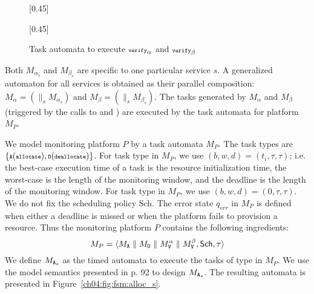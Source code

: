 \begin{figure}[h]
\captionsetup[subfigure]{font=scriptsize}
\centering
{}[0.45\textwidth]{
}%
[0.45\textwidth]{
%
}
\caption{{\scriptsize Task automata to execute ${\scriptsize\texttt{verify}}_\alpha$ and ${\scriptsize\texttt{verify}}_\beta$}}
\end{figure}

Both $M_{\alpha_s}$ and $M_{\beta_s}$ are specific to one particular service $s$.
A generalized automaton for all services is obtained as their parallel composition:$M_\alpha = (\parallel_s M_{\alpha_s})$ and $M_\beta = (\parallel_s M_{\beta_s})$.
The tasks generated by $M_\alpha$ and $M_\beta$ (triggered by the calls to
 and ) are executed by the task automata for platform $M_P$.

We model monitoring platform $P$ by a task automata $M_P$.
The task types are $\{{\scriptsize\texttt{A}}({\scriptsize\texttt{allocate}}),\allowbreak {\scriptsize\texttt{D}}({\scriptsize\texttt{deallocate}})\}$.
For task type  in $M_P$, we use $(b,w,d) = (t_i,\tau,\tau)$; i.e.
the best-case execution time of a task is the resource initialization time, 
the worst-case is the length of the monitoring window, and
the deadline is the length of the monitoring window.
For task type  in $M_P$, we use $(b,w,d) =(0, \tau,\tau)$. 
We do not fix the scheduling policy \textsf{Sch}.
The error state $q_{err}$ in $M_P$ is defined when either a deadline is missed or when the platform fails to provision a resource.
Thus the monitoring platform $P$ contains the following ingredients:
\[
M_P = \langle M_{{\scriptsize\texttt{A}}} \parallel M_{{\scriptsize\texttt{D}}} \parallel 
M^{\alpha}_{{\scriptsize\texttt{V}}} \parallel M^{\beta}_{{\scriptsize\texttt{V}}}
, \textsf{Sch}, \tau \rangle
\]
We define $M_{{\scriptsize\texttt{A}}_s}$ as the timed automata to execute the tasks of type  in $M_P$.
We use the model  semantics presented in \cite{jaghoori2010time} p. 92 to design $M_{{\scriptsize\texttt{A}}_s}$. The resulting automata is presented in Figure~\ref{ch04:fig:fsm:alloc_s}.

